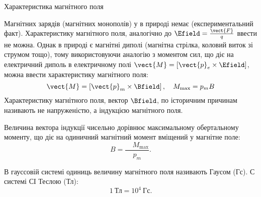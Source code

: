 \documentclass{beamer}
\begin{document}
\begin{frame}{Характеристика магнітного поля}{}\small
	\begin{block}{}\justifying
		Магнітних зарядів (магнітних монополів) у в природі немає (експериментальний факт). Характеристику магнітного поля, аналогічно до $\Efield =
			\frac{\vect{F}}{q}$
		ввести не можна. Однак в природі є магнітні диполі (магнітна стрілка, коловий виток зі струмом тощо), тому використовуючи аналогію з моментом
		сил, що діє на електричний диполь в електричному полі $ \vect{M} = \left[\vect{p}_e \times\Efield\right] $, можна ввести характеристику
		магнітного поля:
		\begin{equation*}
			\vect{M} = \left[\vect{p}_m \times\Bfield\right], \quad M_{\max} = p_m B
		\end{equation*}
		Характеристику магнітного поля, вектор $\Bfield$, по історичним причинам називають не \alert{напруженістю}, а \alert{індукцією} магнітного поля.
	\end{block}
	\begin{overprint}
		\begin{block}{}\justifying
			Величина вектора індукції чисельно дорівнює максимальному обертальному моменту, що діє на одиничний магнітний момент вміщений у магнітне поле:
			\begin{equation*}
				B = \frac{\quad M_{\max}}{p_m}.
			\end{equation*}
		\end{block}
		\begin{alertblock}{}\justifying
			В гауссовій системі одиниць величину магнітного поля називають Гаусом (Гс). С системі СІ Теслою (Тл):
			\begin{equation*}
				1\ \text{Тл} = 10^4\ \text{Гс}.
			\end{equation*}
		\end{alertblock}
	\end{overprint}
\end{frame}
\end{document}

